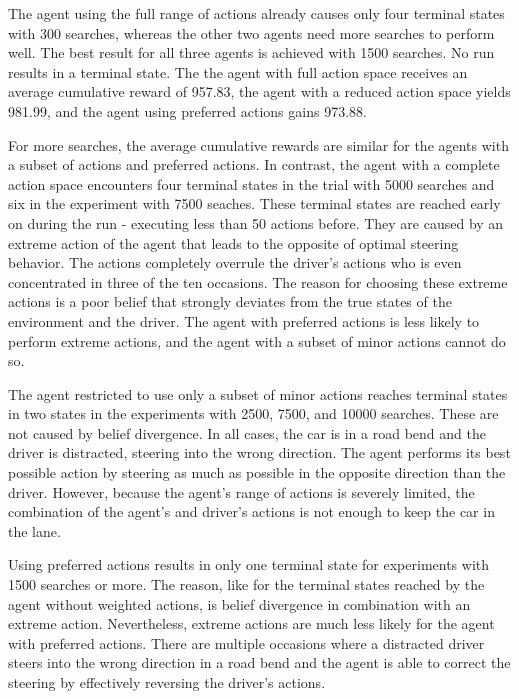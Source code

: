 

The agent using the full range of actions already causes only four terminal states with 300 searches, whereas the other two agents need more searches to perform well. The best result for all three agents is achieved with 1500 searches. No run results in a terminal state. The the agent with full action space receives an average cumulative reward of 957.83, the agent with a reduced action space yields 981.99, and the agent using preferred actions gains 973.88. 

For more searches, the average cumulative rewards are similar for the agents with a subset of actions and preferred actions. In contrast, the agent with a complete action space encounters four terminal states in the trial with 5000 searches and six in the experiment with 7500 seaches. These terminal states are reached early on during the run - executing less than 50 actions before. They are caused by an extreme action of the agent that leads to the opposite of optimal steering behavior. The actions completely overrule the driver's actions who is even concentrated in three of the ten occasions. The reason for choosing these extreme actions is a poor belief that strongly deviates from the true states of the environment and the driver. The agent with preferred actions is less likely to perform extreme actions, and the agent with a subset of minor actions cannot do so. 



The agent restricted to use only a subset of minor actions reaches terminal states in two states in the experiments with 2500, 7500, and 10000 searches. These are not caused by belief divergence. In all cases, the car is in a road bend and the driver is distracted, steering into the wrong direction. The agent performs its best possible action by steering as much as possible in the opposite direction than the driver. However, because the agent's range of actions is severely limited, the combination of the agent's and driver's actions is not enough to keep the car in the lane. 

Using preferred actions results in only one terminal state for experiments with 1500 searches or more. The reason, like for the terminal states reached by the agent without weighted actions, is belief divergence in combination with an extreme action. Nevertheless, extreme actions are much less likely for the agent with preferred actions. There are multiple occasions where a distracted driver steers into the wrong direction in a road bend and the agent is able to correct the steering by effectively reversing the driver's actions.

